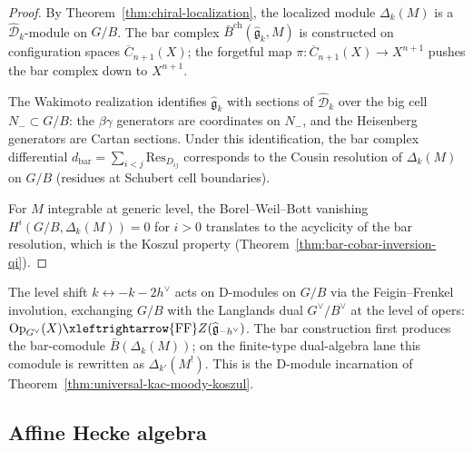 \begin{proof}
By Theorem~\ref{thm:chiral-localization}, the localized module
$\Delta_k(M)$ is a $\widehat{\mathcal{D}}_k$-module on $G/B$.
The bar complex $\bar{B}^{\mathrm{ch}}(\widehat{\mathfrak{g}}_k, M)$
is constructed on configuration spaces
$\overline{C}_{n+1}(X)$; the forgetful map
$\pi: \overline{C}_{n+1}(X) \to X^{n+1}$ pushes the bar complex
down to $X^{n+1}$.

The Wakimoto realization identifies $\widehat{\mathfrak{g}}_k$
with sections of $\widehat{\mathcal{D}}_k$ over the big cell
$N_- \subset G/B$: the $\beta\gamma$ generators are coordinates on
$N_-$, and the Heisenberg generators are Cartan sections. Under this
identification, the bar complex differential
$d_{\mathrm{bar}} = \sum_{i<j} \mathrm{Res}_{D_{ij}}$ corresponds
to the Cousin resolution of $\Delta_k(M)$ on $G/B$ (residues at
Schubert cell boundaries).

For $M$ integrable at generic level, the Borel--Weil--Bott vanishing
$H^i(G/B, \Delta_k(M)) = 0$ for $i > 0$ translates to the acyclicity
of the bar resolution, which is the Koszul property
(Theorem~\ref{thm:bar-cobar-inversion-qi}).
\end{proof}

\begin{remark}
\label{rem:koszul-langlands-flag}
The level shift $k \leftrightarrow -k - 2h^\vee$ acts on
D-modules on $G/B$ via the Feigin--Frenkel involution, exchanging
$G/B$ with the Langlands dual $G^\vee/B^\vee$ at the level of opers:
$\mathrm{Op}_{G^\vee}(X) \xleftrightarrow{\mathrm{FF}}
Z(\widehat{\mathfrak{g}}_{-h^\vee})$. The bar construction first
produces the bar-comodule $\bar{B}(\Delta_k(M))$; on the finite-type
dual-algebra lane this comodule is rewritten as
$\Delta_{k'}(M^!)$. This is the D-module incarnation of
Theorem~\ref{thm:universal-kac-moody-koszul}.
\end{remark}

\subsection{Affine Hecke algebra}


